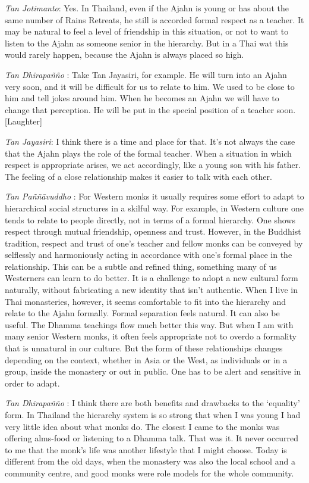 \emph{Tan Jotimanto}: Yes. In Thailand, even if the Ajahn is young or
has about the same number of Rains Retreats, he still is accorded formal
respect as a teacher. It may be natural to feel a level of friendship in
this situation, or not to want to listen to the Ajahn as someone senior
in the hierarchy. But in a Thai wat this would rarely happen, because
the Ajahn is always placed so high.

\emph{Tan Dhirapañño} : Take Tan Jayasiri, for example. He will turn
into an Ajahn very soon, and it will be difficult for us to relate to
him. We used to be close to him and tell jokes around him. When he
becomes an Ajahn we will have to change that perception. He will be put
in the special position of a teacher soon. {[}Laughter{]}

\emph{Tan Jayasiri}: I think there is a time and place for that. It's
not always the case that the Ajahn plays the role of the formal teacher.
When a situation in which respect is appropriate arises, we act
accordingly, like a young son with his father. The feeling of a close
relationship makes it easier to talk with each other.

\emph{Tan Paññāvuddho} : For Western monks it usually requires some
effort to adapt to hierarchical social structures in a skilful way. For
example, in Western culture one tends to relate to people directly, not
in terms of a formal hierarchy. One shows respect through mutual
friendship, openness and trust. However, in the Buddhist tradition,
respect and trust of one's teacher and fellow monks can be conveyed by
selflessly and harmoniously acting in accordance with one's formal place
in the relationship. This can be a subtle and refined thing, something
many of us Westerners can learn to do better. It is a challenge to adopt
a new cultural form naturally, without fabricating a new identity that
isn't authentic. When I live in Thai monasteries, however, it seems
comfortable to fit into the hierarchy and relate to the Ajahn formally.
Formal separation feels natural. It can also be useful. The Dhamma
teachings flow much better this way. But when I am with many senior
Western monks, it often feels appropriate not to overdo a formality that
is unnatural in our culture. But the form of these relationships changes
depending on the context, whether in Asia or the West, as individuals or
in a group, inside the monastery or out in public. One has to be alert
and sensitive in order to adapt.

\emph{Tan Dhirapañño} : I think there are both benefits and drawbacks to
the `equality' form. In Thailand the hierarchy system is so strong that
when I was young I had very little idea about what monks do. The closest
I came to the monks was offering alms-food or listening to a Dhamma
talk. That was it. It never occurred to me that the monk's life was
another lifestyle that I might choose. Today is different from the old
days, when the monastery was also the local school and a community
centre, and good monks were role models for the whole community.

